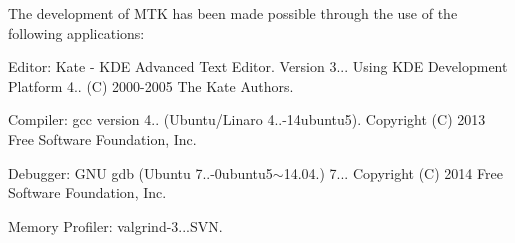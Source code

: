The development of M\+T\+K has been made possible through the use of the following applications\+:
\begin{DoxyEnumerate}
\item Editor\+: Kate -\/ K\+D\+E Advanced Text Editor. Version 3... Using K\+D\+E Development Platform 4.. (C) 2000-\/2005 The Kate Authors.
\item Compiler\+: gcc version 4.. (Ubuntu/\+Linaro 4..-\/14ubuntu5). Copyright (C) 2013 Free Software Foundation, Inc.
\item Debugger\+: G\+N\+U gdb (Ubuntu 7..-\/0ubuntu5$\sim$14.04.) 7... Copyright (C) 2014 Free Software Foundation, Inc.
\item Memory Profiler\+: valgrind-\/3...\+S\+V\+N. 
\end{DoxyEnumerate}
